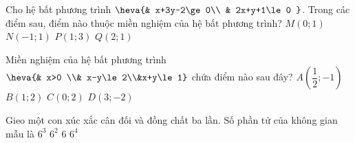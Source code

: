 \begin{ex}%
	Cho hệ bất phương trình $\heva{& x+3y-2\ge0\\ & 2x+y+1\le0 }$. Trong các điểm sau, điểm nào  thuộc miền nghiệm của hệ bất phương trình?
	\choice 
		{$M\left(0;1\right)$} 
		{\True  $N\left(-1;1\right)$}
		 {$P\left(1;3\right)$}
		{$Q\left(2;1\right)$} 
\end{ex}

\begin{ex}%
	Miền nghiệm của hệ bất phương trình  $\heva{& x>0 \\& x-y\le2\\&x+y\le1}$ chứa điểm nào sau đây?
	\choice 
		{\True $A\left(\dfrac{1}{2};-1\right)$} 
		 {$B\left(1;2\right)$}
		 {$C\left(0;2\right)$}
		 {$D\left(3;-2\right)$}
\end{ex}

\begin{ex}%
	Gieo một con xúc xắc cân đối và đồng chất ba lần. Số  phần tử của không gian mẫu là
	 \choice
		 {\True $6^3$}
		 {$6^2$}
		{$6$} 
		 {$6^4$}
\end{ex}

